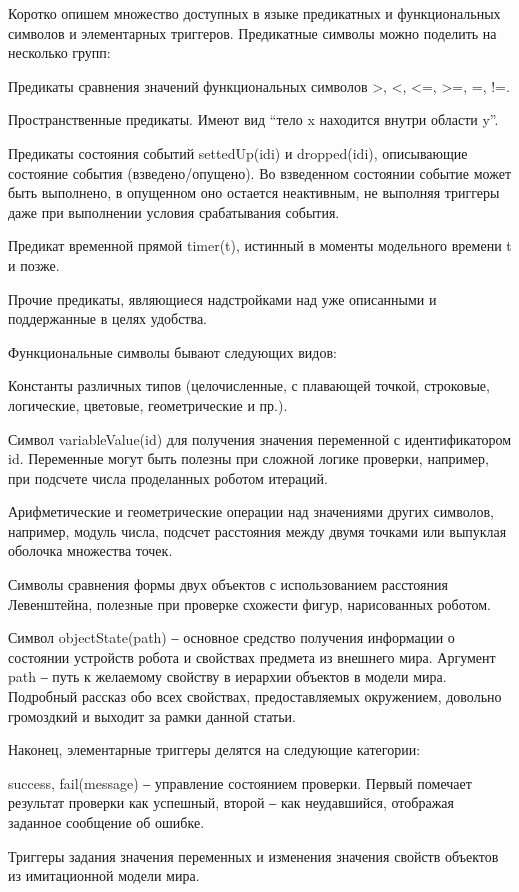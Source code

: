 ﻿\documentclass[conference]{IEEEtran}
\begin{document}
Коротко опишем множество доступных в языке предикатных и функциональных символов и элементарных триггеров. Предикатные символы можно поделить на несколько групп:

Предикаты сравнения значений функциональных символов >, <, <=, >=, =, !=.

Пространственные предикаты. Имеют вид “тело x находится внутри области y”.

Предикаты состояния событий settedUp(idi) и dropped(idi), описывающие состояние события (взведено/опущено). Во взведенном состоянии событие может быть выполнено, в опущенном оно остается неактивным, не выполняя триггеры даже при выполнении условия срабатывания события.

Предикат временной прямой timer(t), истинный в моменты модельного времени t и позже.

Прочие предикаты, являющиеся надстройками над уже описанными и поддержанные в целях удобства.

Функциональные символы бывают следующих видов:

Константы различных типов (целочисленные, с плавающей точкой, строковые, логические, цветовые, геометрические и пр.).

Символ variableValue(id) для получения значения переменной с идентификатором id. Переменные могут быть полезны при сложной логике проверки, например, при подсчете числа проделанных роботом итераций.

Арифметические и геометрические операции над значениями других символов, например, модуль числа, подсчет расстояния между двумя точками или выпуклая оболочка множества точек.

Символы сравнения формы двух объектов с использованием расстояния Левенштейна, полезные при проверке схожести фигур, нарисованных роботом.

Символ objectState(path) ‒ основное средство получения информации о состоянии устройств робота и свойствах предмета из внешнего мира. Аргумент path ‒ путь к желаемому свойству в иерархии объектов в модели мира. Подробный рассказ обо всех свойствах, предоставляемых окружением, довольно громоздкий и выходит за рамки данной статьи.

Наконец, элементарные триггеры делятся на следующие категории:

success, fail(message) ‒ управление состоянием проверки. Первый помечает результат проверки как успешный, второй ‒ как неудавшийся, отображая заданное сообщение об ошибке.

Триггеры задания значения переменных и изменения значения свойств объектов из имитационной модели мира.
\end{document}
